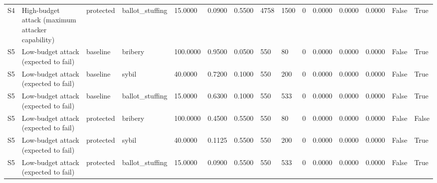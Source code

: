 \documentclass[11pt,a4paper]{article}
\begin{document}
\begin{landscape}
{{\begin{tabular}{lllllllllllllll}
S4 & High-budget attack (maximum attacker capability) & protected & ballot\_stuffing & 15.0000 & 0.0900 & 0.5500 & 4758 & 1500 & 0 & 0.0000 & 0.0000 & 0.0000 & False & True \\
S5 & Low-budget attack (expected to fail) & baseline & bribery & 100.0000 & 0.9500 & 0.0500 & 550 & 80 & 0 & 0.0000 & 0.0000 & 0.0000 & False & True \\
S5 & Low-budget attack (expected to fail) & baseline & sybil & 40.0000 & 0.7200 & 0.1000 & 550 & 200 & 0 & 0.0000 & 0.0000 & 0.0000 & False & True \\
S5 & Low-budget attack (expected to fail) & baseline & ballot\_stuffing & 15.0000 & 0.6300 & 0.1000 & 550 & 533 & 0 & 0.0000 & 0.0000 & 0.0000 & False & True \\
S5 & Low-budget attack (expected to fail) & protected & bribery & 100.0000 & 0.4500 & 0.5500 & 550 & 80 & 0 & 0.0000 & 0.0000 & 0.0000 & False & False \\
S5 & Low-budget attack (expected to fail) & protected & sybil & 40.0000 & 0.1125 & 0.5500 & 550 & 200 & 0 & 0.0000 & 0.0000 & 0.0000 & False & True \\
S5 & Low-budget attack (expected to fail) & protected & ballot\_stuffing & 15.0000 & 0.0900 & 0.5500 & 550 & 533 & 0 & 0.0000 & 0.0000 & 0.0000 & False & True \\
\bottomrule
\end{tabular}
}
}
\end{landscape}
\end{document}
